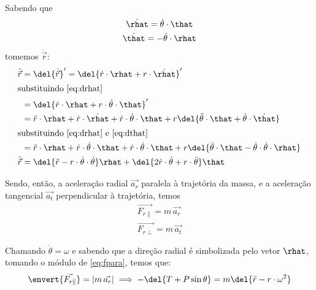 \documentclass[]{IMTexam}
\begin{document}
\begin{questions}
\begin{solution}
\begin{unindent}
			\item  Sabendo que
			\begin{gather}
				\dot{\rhat}=\dot{\theta}\cdot\that\label{eq:drhat}\\
				\dot{\that}=-\dot{\theta}\cdot\rhat\label{eq:dthat}
			\end{gather}
			tomemos $ \ddot{\vec{r}} $:
			\begin{align}
				\ddot{\vec{r}} & =\del{\dot{\vec{r}}}'=\del{\dot{r}\cdot\rhat+r\cdot\dot{\rhat}}'\nonumber                                                                                                 \\
				\intertext{substituindo \ref{eq:drhat}}
				               & =\del{\dot{r}\cdot\rhat+r\cdot\dot{\theta}\cdot\that}'\nonumber                                                                                                           \\
				               & =\ddot{r}\cdot\rhat+\dot{r}\cdot\dot{\rhat}+\dot{r}\cdot\dot{\theta}\cdot\that+r\del{\ddot{\theta}\cdot\that+\dot{\theta}\cdot\dot{\that}}\nonumber                       \\
				\intertext{substituindo \ref{eq:drhat} e \ref{eq:dthat}}
				               & =\ddot{r}\cdot\rhat+\dot{r}\cdot\dot{\theta}\cdot\that+\dot{r}\cdot\dot{\theta}\cdot\that+r\del{\ddot{\theta}\cdot\that-\dot{\theta}\cdot\dot{\theta}\cdot\rhat}\nonumber \\
				\ddot{\vec{r}} & =\del{\ddot{r}-r\cdot\dot{\theta}\cdot\dot{\theta}}\rhat+\del{2\dot{r}\cdot\dot{\theta}+r\cdot\ddot{\theta}}\that\label{eq:ddotr}
			\end{align}

			Sendo, então, a aceleração radial $ \vec{a_r} $ paralela à trajetória da massa, e a aceleração tangencial $ \vec{a_t} $ perpendicular à trajetória, temos
			\begin{gather}
				\vec{F_{r\parallel}}=m\,\vec{a_r}\label{eq:fpara}\\
				\vec{F_{r\perp}}=m\,\vec{a_t}\label{eq:fperp}
			\end{gather}

			Chamando $ \dot{\theta}=\omega $ e sabendo que a direção radial é simbolizada pelo vetor $ \rhat $, tomando o módulo de \ref{eq:fpara}, temos que:
			\begin{equation}\label{eq:fparacomp}
				\envert{\vec{F_{r\parallel}}}=|m\,\vec{a_r}|\implies -\del{T+P\sin\theta}=m\del{\ddot{r}-r\cdot\omega^{2}}
			\end{equation}


\end{unindent}
\end{solution}
\end{questions}
\end{document}
